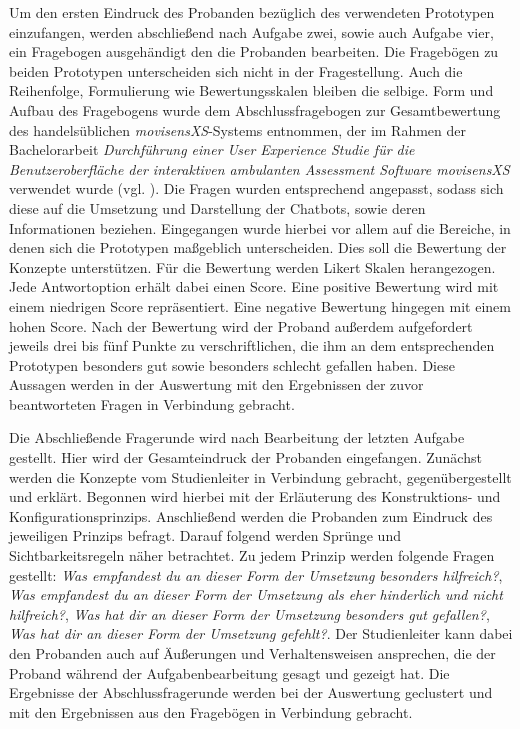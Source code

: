 Um den ersten Eindruck des Probanden bezüglich des verwendeten Prototypen einzufangen, werden abschließend nach Aufgabe zwei, sowie auch Aufgabe vier, ein Fragebogen ausgehändigt den die Probanden bearbeiten. Die Fragebögen zu beiden Prototypen unterscheiden sich nicht in der Fragestellung. Auch die Reihenfolge, Formulierung wie Bewertungsskalen bleiben die selbige. Form und Aufbau des Fragebogens wurde dem Abschlussfragebogen zur Gesamtbewertung des handelsüblichen \emph{movisensXS}-Systems entnommen, der im Rahmen der Bachelorarbeit \emph{Durchführung einer User Experience Studie für die Benutzeroberfläche der interaktiven ambulanten Assessment Software movisensXS} verwendet wurde (vgl. \cite{lindabrandl}). Die Fragen wurden entsprechend angepasst, sodass sich diese auf die Umsetzung und Darstellung der Chatbots, sowie deren Informationen beziehen. Eingegangen wurde hierbei vor allem auf die Bereiche, in denen sich die Prototypen maßgeblich unterscheiden. Dies soll die Bewertung der Konzepte unterstützen. Für die Bewertung werden Likert Skalen herangezogen. Jede Antwortoption erhält dabei einen Score. Eine positive Bewertung wird mit einem niedrigen Score repräsentiert. Eine negative Bewertung hingegen mit einem hohen Score. Nach der Bewertung wird der Proband außerdem aufgefordert jeweils drei bis fünf Punkte zu verschriftlichen, die ihm an dem entsprechenden Prototypen besonders gut sowie besonders schlecht gefallen haben. Diese Aussagen werden in der Auswertung mit den Ergebnissen der zuvor beantworteten Fragen in Verbindung gebracht.

Die Abschließende Fragerunde wird nach Bearbeitung der letzten Aufgabe gestellt. Hier wird der Gesamteindruck der Probanden eingefangen. Zunächst werden die Konzepte vom Studienleiter in Verbindung gebracht, gegenübergestellt und erklärt. Begonnen wird hierbei mit der Erläuterung des Konstruktions- und Konfigurationsprinzips. Anschließend werden die Probanden zum Eindruck des jeweiligen Prinzips befragt. Darauf folgend werden Sprünge und Sichtbarkeitsregeln näher betrachtet. Zu jedem Prinzip werden folgende Fragen gestellt: \emph{Was empfandest du an dieser Form der Umsetzung besonders hilfreich?}, \emph{Was empfandest du an dieser Form der Umsetzung als eher hinderlich und nicht hilfreich?}, \emph{Was hat dir an dieser Form der Umsetzung besonders gut gefallen?}, \emph{Was hat dir an dieser Form der Umsetzung gefehlt?}. Der Studienleiter kann dabei den Probanden auch auf Äußerungen und Verhaltensweisen ansprechen, die der Proband während der Aufgabenbearbeitung gesagt und gezeigt hat. Die Ergebnisse der Abschlussfragerunde werden bei der Auswertung geclustert und mit den Ergebnissen aus den Fragebögen in Verbindung gebracht. 

